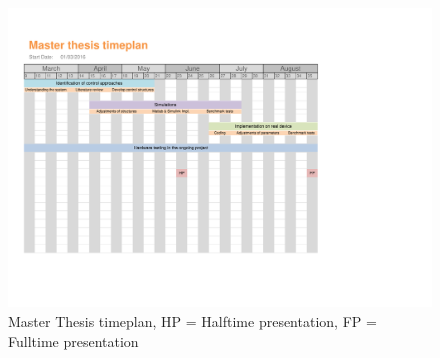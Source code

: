 \begin{figure}[h] %
 \centering %
 \includegraphics[trim=1cm 12cm 5cm 5.5cm, clip=true, scale=0.42]{fig/timeplan}
 \caption{\label{fig:timeplan}%
 Master Thesis timeplan, HP = Halftime presentation, FP = Fulltime presentation}
 \end{figure}
